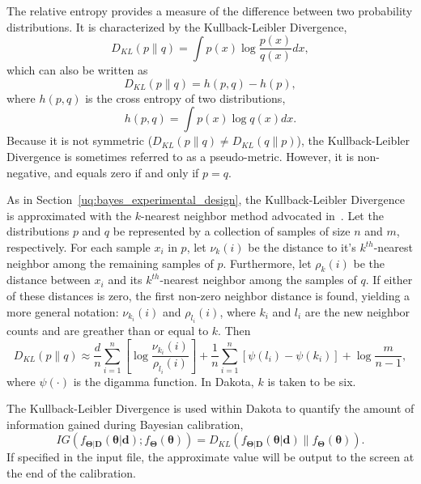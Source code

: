 The relative entropy provides a measure of the difference between two 
probability distributions. It is characterized by the Kullback-Leibler 
Divergence,
\begin{equation}
D_{KL}(p \| q) = \int p(x) \log \frac{p(x)}{q(x)} dx,
\label{dkl_discrete}
\end{equation}
which can also be written as 
\begin{equation}
D_{KL}( p \| q)  = h(p,q) - h(p),
\end{equation}
where $h(p,q)$ is the cross entropy of two distributions,
\begin{equation}
h(p,q) = \int p(x) \log q(x) dx.
\end{equation}
Because it is not symmetric ($D_{KL} (p \| q) \neq D_{KL} (q \| p)$), the 
Kullback-Leibler Divergence is sometimes referred to as a pseudo-metric. 
However, it is non-negative, and equals zero if and only if $p = q$. 

As in Section~\ref{uq:bayes_experimental_design}, the Kullback-Leibler 
Divergence is approximated with the $k$-nearest neighbor method advocated 
in~\cite{Per2008}. Let the distributions $p$ and $q$ be represented by a 
collection of samples of size $n$ and $m$, respectively. For each sample $x_{i}$
in $p$, let $\nu_{k}(i)$ be the distance to it's $k^{th}$-nearest neighbor among
the remaining samples of $p$. Furthermore, let $\rho_{k}(i)$ be the distance 
between $x_{i}$ and its $k^{th}$-nearest neighbor among the samples of $q$. If 
either of these distances is zero, the first non-zero neighbor distance is 
found, yielding a more general notation: $\nu_{k_i}(i)$ and $\rho_{l_i}(i)$, 
where $k_{i}$ and $l_{i}$ are the new neighbor counts and are greather than or 
equal to $k$. Then 
\begin{equation}
D_{KL}(p \| q) \approx \frac{d}{n} \sum_{i=1}^{n} \left[ \log \frac{
\nu_{k_{i}}(i)}{\rho_{l_{i}}(i)} \right] + \frac{1}{n} \sum_{i=1}^{n} 
\left[ \psi(l_{i}) - \psi(k_{i}) \right] + \log \frac{m}{n-1},
\end{equation}
where $\psi(\cdot)$ is the digamma function. In Dakota, $k$ is taken to be six.

The Kullback-Leibler Divergence is used within Dakota to quantify the amount of
information gained during Bayesian calibration,
\begin{equation}
IG( f_{\boldsymbol{\Theta | D}}(\boldsymbol{\theta| d}); 
f_{\boldsymbol{\Theta}}(\boldsymbol{\theta}))
= D_{KL}( f_{\boldsymbol{\Theta | D}}(\boldsymbol{\theta| d}) \| 
f_{\boldsymbol{\Theta}}(\boldsymbol{\theta}) ). 
\end{equation}
If specified in the input file, the approximate value will be output to the
screen at the end of the calibration.

